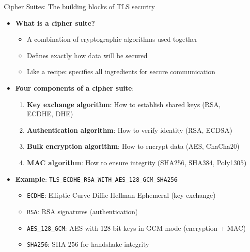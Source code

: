 \documentclass[aspectratio=169, lualatex, handout]{beamer}
\begin{document}
\begin{frame}{Cipher Suites: The building blocks of TLS security}
	\begin{itemize}
		\item \textbf{What is a cipher suite?}
		      \begin{itemize}
			      \item A combination of cryptographic algorithms used together
			      \item Defines exactly how data will be secured
			      \item Like a recipe: specifies all ingredients for secure communication
		      \end{itemize}
		\item \textbf{Four components of a cipher suite}:
		      \begin{enumerate}
			      \item \textbf{Key exchange algorithm}: How to establish shared keys (RSA, ECDHE, DHE)
			      \item \textbf{Authentication algorithm}: How to verify identity (RSA, ECDSA)
			      \item \textbf{Bulk encryption algorithm}: How to encrypt data (AES, ChaCha20)
			      \item \textbf{MAC algorithm}: How to ensure integrity (SHA256, SHA384, Poly1305)
		      \end{enumerate}
		\item \textbf{Example}: \texttt{TLS\_ECDHE\_RSA\_WITH\_AES\_128\_GCM\_SHA256}
		      \begin{itemize}
			      \item \texttt{ECDHE}: Elliptic Curve Diffie-Hellman Ephemeral (key exchange)
			      \item \texttt{RSA}: RSA signatures (authentication)
			      \item \texttt{AES\_128\_GCM}: AES with 128-bit keys in GCM mode (encryption + MAC)
			      \item \texttt{SHA256}: SHA-256 for handshake integrity
		      \end{itemize}
	\end{itemize}
\end{frame}
\end{document}
